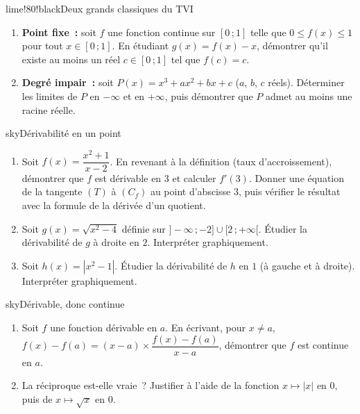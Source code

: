 \begin{exo}{lime!80!black}{Deux grands classiques du TVI \demo\ }
\begin{enumerate}
  \item \textbf{Point fixe~:} soit $f$ une fonction continue sur $[0\,;1]$ telle que $0\leq f(x)\leq1$ pour tout $x\in[0\,;1]$. En étudiant $g(x)=f(x)-x$, démontrer qu'il existe au moins un réel $c\in[0\,;1]$ tel que $f(c)=c$.
  \item \textbf{Degré impair~:} soit $P(x)=x^3+ax^2+bx+c$ ($a$, $b$, $c$ réels). Déterminer les limites de $P$ en $-\infty$ et en $+\infty$, puis démontrer que $P$ admet au moins une racine réelle.
\end{enumerate}
\end{exo}


\begin{exo}{sky}{Dérivabilité en un point \demo\ }
\begin{enumerate}
  \item Soit $f(x)=\dfrac{x^2+1}{x-2}$. En revenant à la définition (taux d'accroissement), démontrer que $f$ est dérivable en $3$ et calculer $f'(3)$. Donner une équation de la tangente $(T)$ à $(C_f)$ au point d'abscisse $3$, puis vérifier le résultat avec la formule de la dérivée d'un quotient.
  \item Soit $g(x)=\sqrt{x^2-4}$ définie sur $]-\infty\,;-2]\cup[2\,;+\infty[$. Étudier la dérivabilité de $g$ à droite en $2$. Interpréter graphiquement.
  \item Soit $h(x)=|x^2-1|$. Étudier la dérivabilité de $h$ en $1$ (à gauche et à droite). Interpréter graphiquement.
\end{enumerate}
\end{exo}

\begin{exo}{sky}{Dérivable, donc continue \demo\ }
\begin{enumerate}
  \item Soit $f$ une fonction dérivable en $a$. En écrivant, pour $x\neq a$, \ $f(x)-f(a)=(x-a)\times\dfrac{f(x)-f(a)}{x-a}$, démontrer que $f$ est continue en $a$.
  \item La réciproque est-elle vraie~? Justifier à l'aide de la fonction $x\mapsto|x|$ en $0$, puis de $x\mapsto\sqrt x$ en $0$.
\end{enumerate}
\end{exo}

